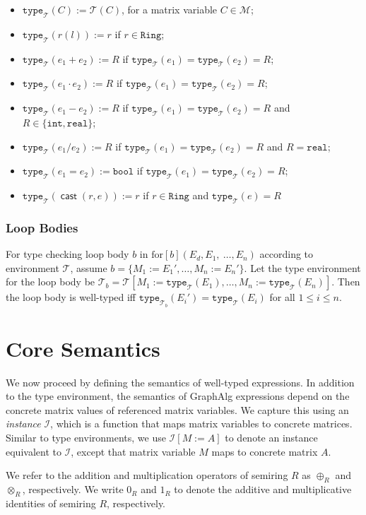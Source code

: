 \documentclass{article}
\newcommand\graphalg{\textsf{GraphAlg}}
\DeclareMathOperator{\cast}{\mathsf{cast}}
\newcommand{\tenv}{\mathcal{T}}
\newcommand{\Ring}{\texttt{Ring}}
\newcommand{\ttypet}{\texttt{type}_{\tenv}}
\newcommand{\I}{\mathcal{I}}
\newcommand{\ttype}{\texttt{type}}
\newcommand{\Mnam}{\mathcal{M}}
\begin{document}
\begin{itemize}
    \item $\ttypet(C):= \tenv(C)$, for a matrix variable $C\in\Mnam$;
    \item $\ttypet(r(l)):= r$ if $r \in \Ring$;
    \item $\ttypet(e_1 + e_2):= R$ if $\ttypet(e_1) = \ttypet(e_2) = R$;
    \item $\ttypet(e_1 \cdot e_2):= R$ if $\ttypet(e_1) = \ttypet(e_2) = R$;
    \item $\ttypet(e_1 - e_2):= R$ if $\ttypet(e_1) = \ttypet(e_2) = R$ and $R \in \{ \texttt{int}, \texttt{real} \}$;
    \item $\ttypet(e_1 / e_2):= R$ if $\ttypet(e_1) = \ttypet(e_2) = R$ and $R = \texttt{real}$;
    \item $\ttypet(e_1 = e_2):= \texttt{bool}$ if $\ttypet(e_1) = \ttypet(e_2) = R$;
    \item $\ttypet(\cast(r,e)):= r$ if $r \in \Ring$ and $\ttypet(e) = R$
\end{itemize}

\subsubsection*{Loop Bodies}
For type checking loop body $b$ in $\text{for}[b](E_d, E_1,\ \ldots,E_n)$ according to environment $\tenv$, assume $b = \{ M_1 := E_1',\ldots,M_n := E_n' \}$.
Let the type environment for the loop body be $\tenv_b = \tenv[M_1 := \ttypet(E_1),\ldots,M_n := \ttypet(E_n)]$.
Then the loop body is well-typed iff $\ttype_{\tenv_b}(E_i') = \ttypet(E_i)$ for all $1 \leq i \leq n$.

\section{Core Semantics}
We now proceed by defining the semantics of well-typed expressions.
In addition to the type environment, the semantics of \graphalg{} expressions depend on the concrete matrix values of referenced matrix variables.
We capture this using an \emph{instance} $\I$, which is a function that maps matrix variables to concrete matrices.
Similar to type environments, we use $\I[M := A]$ to denote an instance equivalent to $\I$, except that matrix variable $M$ maps to concrete matrix $A$.

We refer to the addition and multiplication operators of semiring $R$ as $\oplus_R$ and $\otimes_R$, respectively.
We write $0_R$ and $1_R$ to denote the additive and multiplicative identities of semiring $R$, respectively.
\end{document}
